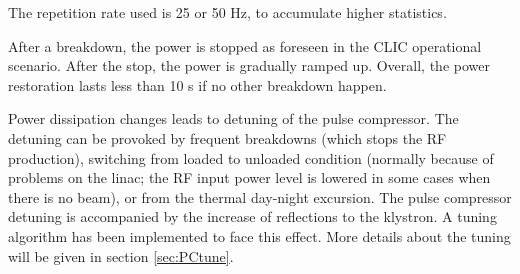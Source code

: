 The repetition rate used is 25 or 50 Hz, to accumulate higher statistics.

After a breakdown, the power is stopped as foreseen in the CLIC operational scenario. After the stop, the power is gradually ramped up. Overall, the power restoration lasts less than 10 s if no other breakdown happen.

Power dissipation changes leads to detuning of the pulse compressor. The detuning can be provoked by frequent breakdowns (which stops the RF production),  switching from loaded to unloaded condition (normally because of problems on the linac; the RF input power level is lowered in some cases when there is no beam), or from the thermal day-night excursion. The pulse compressor detuning is accompanied by the increase of reflections to the klystron. A tuning algorithm has been implemented to face this effect. More details about the tuning will be given in section \ref{sec:PCtune}.